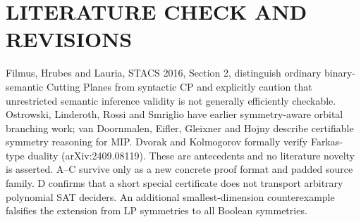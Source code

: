 \documentclass[11pt]{article}
\begin{document}
\section{LITERATURE CHECK AND REVISIONS}
Filmus, Hrubes and Lauria, STACS 2016, Section 2, distinguish ordinary binary-semantic Cutting Planes from syntactic CP and explicitly caution that unrestricted semantic inference validity is not generally efficiently checkable. Ostrowski, Linderoth, Rossi and Smriglio have earlier symmetry-aware orbital branching work; van Doornmalen, Eifler, Gleixner and Hojny describe certifiable symmetry reasoning for MIP. Dvorak and Kolmogorov formally verify Farkas-type duality (arXiv:2409.08119). These are antecedents and no literature novelty is asserted. A--C survive only as a new concrete proof format and padded source family. D confirms that a short special certificate does not transport arbitrary polynomial SAT deciders. An additional smallest-dimension counterexample falsifies the extension from LP symmetries to all Boolean symmetries.
\end{document}
